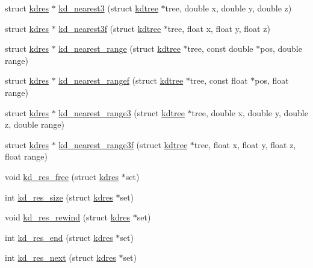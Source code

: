 \begin{DoxyCompactItemize}
\item 
struct \hyperlink{a00010}{kdres} $\ast$ \hyperlink{a00014_ad5d009b99e7804547508048f49b79d30_ad5d009b99e7804547508048f49b79d30}{kd\-\_\-nearest3} (struct \hyperlink{a00011}{kdtree} $\ast$tree, double x, double y, double z)
\item 
struct \hyperlink{a00010}{kdres} $\ast$ \hyperlink{a00014_a9811ac60c0e418bd5d0537e3a3568b6f_a9811ac60c0e418bd5d0537e3a3568b6f}{kd\-\_\-nearest3f} (struct \hyperlink{a00011}{kdtree} $\ast$tree, float x, float y, float z)
\item 
struct \hyperlink{a00010}{kdres} $\ast$ \hyperlink{a00014_ae7470d6cc3e640ff79c19fb60016763d_ae7470d6cc3e640ff79c19fb60016763d}{kd\-\_\-nearest\-\_\-range} (struct \hyperlink{a00011}{kdtree} $\ast$tree, const double $\ast$pos, double range)
\item 
struct \hyperlink{a00010}{kdres} $\ast$ \hyperlink{a00014_ac0425455c7c9b8b0a0058ab16d00b4a4_ac0425455c7c9b8b0a0058ab16d00b4a4}{kd\-\_\-nearest\-\_\-rangef} (struct \hyperlink{a00011}{kdtree} $\ast$tree, const float $\ast$pos, float range)
\item 
struct \hyperlink{a00010}{kdres} $\ast$ \hyperlink{a00014_a205361bbf9b2378819b17a1e101c1d23_a205361bbf9b2378819b17a1e101c1d23}{kd\-\_\-nearest\-\_\-range3} (struct \hyperlink{a00011}{kdtree} $\ast$tree, double x, double y, double z, double range)
\item 
struct \hyperlink{a00010}{kdres} $\ast$ \hyperlink{a00014_a31785d1b48d785e7c8f178a40671d4f4_a31785d1b48d785e7c8f178a40671d4f4}{kd\-\_\-nearest\-\_\-range3f} (struct \hyperlink{a00011}{kdtree} $\ast$tree, float x, float y, float z, float range)
\item 
void \hyperlink{a00014_ae783df8818133e4fb833e9203302f162_ae783df8818133e4fb833e9203302f162}{kd\-\_\-res\-\_\-free} (struct \hyperlink{a00010}{kdres} $\ast$set)
\item 
int \hyperlink{a00014_adb070dde37e9a978f231d730b7a24b53_adb070dde37e9a978f231d730b7a24b53}{kd\-\_\-res\-\_\-size} (struct \hyperlink{a00010}{kdres} $\ast$set)
\item 
void \hyperlink{a00014_a691ff69299aca39887ff3b4b2a0b81f6_a691ff69299aca39887ff3b4b2a0b81f6}{kd\-\_\-res\-\_\-rewind} (struct \hyperlink{a00010}{kdres} $\ast$set)
\item 
int \hyperlink{a00014_a9c331a704388b658a8c8fa779f6c4fe9_a9c331a704388b658a8c8fa779f6c4fe9}{kd\-\_\-res\-\_\-end} (struct \hyperlink{a00010}{kdres} $\ast$set)
\item 
int \hyperlink{a00014_ac2ef7750c902fd26a6d4e882e64df7f8_ac2ef7750c902fd26a6d4e882e64df7f8}{kd\-\_\-res\-\_\-next} (struct \hyperlink{a00010}{kdres} $\ast$set)

\end{DoxyCompactItemize}

